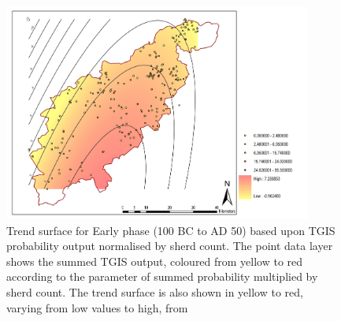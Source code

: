 \begin{figure}
\centering
	\includegraphics[width=0.9\textwidth,height=0.9\textheight,keepaspectratio=true]{figures/green3}
  \caption{Trend surface for Early phase (100 BC to AD 50) based upon TGIS probability output
normalised by sherd count. The point data layer shows the summed TGIS output, coloured from
yellow to red according to the parameter of summed probability multiplied by sherd count. The
trend surface is also shown in yellow to red, varying from low values to high, from \cite{Green:2008fk}}
  \label{fig:green3}
\end{figure}

